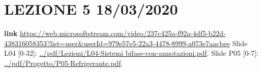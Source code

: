 \section*{LEZIONE 5 18/03/2020}
\textbf{link} \url{https://web.microsoftstream.com/video/237c425a-f92a-4df5-b22d-438316058353?list=user&userId=979e57e5-22a3-4478-8999-a073e7aacbee}\newline
\newline
Slide L04 [0-32]: \url{../pdf/Lezioni/L04-Sistemi bifase-con-annotazioni.pdf}.\newline
\newline
Slide P05 [0-7]: \url{../pdf/Progetto/P05-Refrigerante.pdf}.\newline
\newline